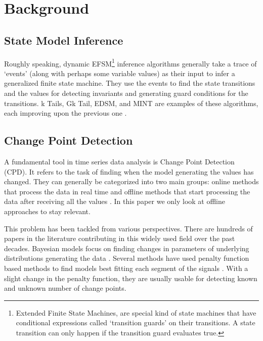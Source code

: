 \section{Background}
\subsection{State Model Inference}
Roughly speaking, dynamic EFSM\footnote{Extended Finite State Machines, are special kind of state machines that have conditional expressions called `transition guards' on their transitions. A state transition can only happen if the transition guard evaluates true.} inference algorithms generally take a trace of `events' (along with perhaps some variable values) as their input \cite{walkinshaw2016inferring} to infer a generalized finite state machine. They use the events to find the state transitions and the values for detecting invariants and generating guard  conditions for the transitions. 
k Tails, Gk Tail, EDSM, and MINT are examples of these algorithms, each improving upon the previous one \cite{biermann1972synthesis, lorenzoli2008automatic, lang1998results, walkinshaw2016inferring}.


\subsection{Change Point Detection}
A fundamental tool in time series data analysis is Change Point Detection (CPD). It refers to the task of finding when the model generating the values has changed. 
They can generally be categorized into two main groups: online methods that process the data in real time and offline methods that start processing the data after receiving all the values  \cite{Truong2018ChangePointSurvey}. 
In this paper we only look at offline approaches to stay relevant.


This problem has been tackled from various perspectives. There are hundreds of papers in the literature contributing in this widely used field over the past decades. \cite{chen2011parametric, hasan2014information, hsu1982bayesian, lee2017implicit, oh2002analyzing, ramos2016anomalies, reeves2007review, rosenfield2010change, wang2011non, xie2013sequential, yamanishi2004line, Lavielle1999} Bayesian models focus on finding changes in parameters of underlying distributions generating the data \cite{Lee2018TimeSeriesSegmentation, adams2007bayesian, bai1997estimation, barry1993bayesian, erdman2008fast, ray2002bayesian}. Several methods have used penalty function based methods to find models best fitting each segment of the signals \cite{Lavielle1999, lavielle2005using, keshavarz2018optimal, pein2017heterogeneous}. With a slight change in the penalty function, they are usually usable for detecting known and unknown number of change points. 

